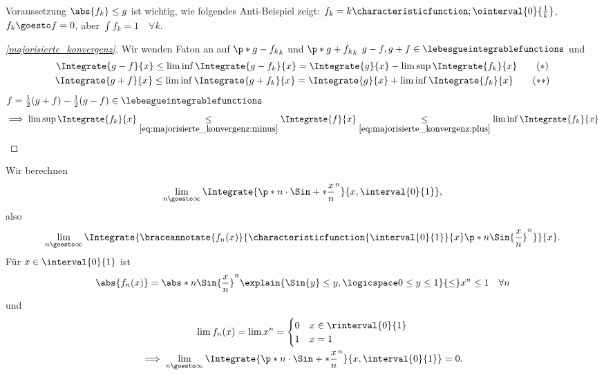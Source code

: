 \begin{bemerkung*}
  Voraussetzung \( \abs{f_k}\leq g \) ist wichtig, wie folgendes Anti-Beispiel zeigt: \( f_k=k \characteristicfunction;{\ointerval{0}{\frac{1}{k}}} \), \( f_k\goesto f=0 \), aber \( \int f_k=1\quad \forall k \).
\end{bemerkung*}
\begin{proof}[\ref{majorisierte_konvergenz}]
  Wir wenden Faton an auf \( \p*{g-f_k}_k \) und \( \p*{g+f_k}_k \) \timplies \( g-f,g+f\in \lebesgueintegrablefunctions \) und 
  \begin{gather*}
    \Integrate{g-f}{x}\leq \liminf \Integrate{g-f_k}{x}=\Integrate{g}{x}-\limsup \Integrate{f_k}{x}\tag{\( * \)} \label{eq:majorisierte_konvergenz:minus}\\
    \Integrate{g+f}{x}\leq \liminf \Integrate{g+f_k}{x}=\Integrate{g}{x}+\liminf \Integrate{f_k}{x}\tag{\( ** \)} \label{eq:majorisierte_konvergenz:plus}
  \end{gather*}
  \( f=\frac{1}{2}(g+f)-\frac{1}{2}(g-f)\in \lebesgueintegrablefunctions \)
  \begin{equation*}
    \implies \limsup \Integrate{f_k}{x}\underset{\eqref{eq:majorisierte_konvergenz:minus}}{\leq}\Integrate{f}{x}\underset{\eqref{eq:majorisierte_konvergenz:plus}}{\leq}\liminf \Integrate{f_k}{x}
  \end{equation*}
\end{proof}
\begin{beispiel*}
  Wir berechnen
  \begin{equation*}
    \lim_{n \goesto \infty}\Integrate{\p*{n\cdot\Sin+*{\frac{x}{n}}}^n}{x,\interval{0}{1}},
  \end{equation*}
  also
  \begin{equation*}
    \lim_{n \goesto \infty}\Integrate{\braceannotate{f_n(x)}{\characteristicfunction{\interval{0}{1}}{x}\p*{n\Sin{\frac{x}{n}}}^n}}{x}.
  \end{equation*}
  Für \( x\in \interval{0}{1} \) ist
  \begin{equation*}
    \abs{f_n(x)}=\abs*{n{\Sin{\frac{x}{n}}}}^n\explain{\Sin{y}\leq y,\logicspace 0\leq y\leq 1}{\leq}x^n\leq 1\quad \forall n
  \end{equation*}
  und
  \begin{gather*}
    \lim f_n(x)=\lim  x^n=\begin{cases}
      0 & x\in \rinterval{0}{1}\\
      1 & x=1
    \end{cases}\\
    \implies \lim_{n \goesto \infty}\Integrate{\p*{n\cdot\Sin+*{\frac{x}{n}}}^n}{x,\interval{0}{1}}=0.
  \end{gather*}
\end{beispiel*}


